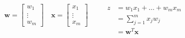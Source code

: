 \begin{frame}
\begin{columns}
\begin{align*} 
\mathbf{w} = \begin{bmatrix}
    w_{1}  \\
    \vdots \\
    w_{m}
\end{bmatrix}
\quad  \mathbf{x} = \begin{bmatrix}
    x_{1}  \\
    \vdots \\
    x_{m}
\end{bmatrix}
\end{align*}

\begin{align*}
\begin{split}
z & =  w_1x_{1} + \dots + w_mx_{m} \\
 & = \sum_{j=1}^{m} x_{j}w_{j} \\
 & = \mathbf{w}^T\mathbf{x}
\end{split}
\end{align*}
\end{columns}
\end{frame}


